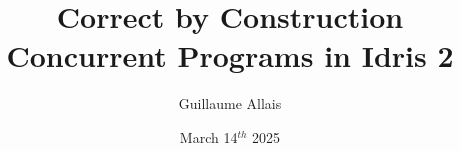 \documentclass[3to2]{beamer}
\title{Correct by Construction Concurrent Programs \newline in Idris 2}
\author{Guillaume Allais}
\institute{University of Strathclyde \\ Glasgow, UK}
\date{March 14$^{th}$ 2025}
\begin{document}
\begin{frame}
  \maketitle
\end{frame}






\end{document}
